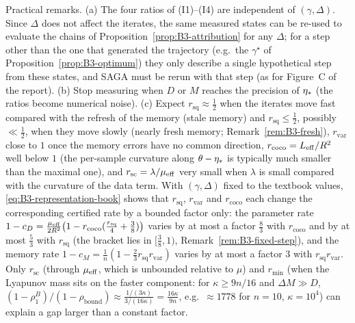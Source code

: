 Practical remarks. (a) The four ratios of (I1)--(I4) are independent of $(\gamma,\Delta)$. Since $\Delta$ does not affect the iterates, the same measured states can be re-used to evaluate the chains of Proposition~\ref{prop:B3-attribution} for any $\Delta$; for a step other than the one that generated the trajectory (e.g.\ the $\gamma^\star$ of Proposition~\ref{prop:B3-optimum}) they only describe a single hypothetical step from these states, and SAGA must be rerun with that step (as for Figure~C of the report). (b) Stop measuring when $D$ or $M$ reaches the precision of $\eta_\ast$ (the ratios become numerical noise). (c) Expect $r_{\mathrm{sq}}\approx\frac12$ when the iterates move fast compared with the refresh of the memory (stale memory) and $r_{\mathrm{sq}}\le\frac12$, possibly $\ll\frac12$, when they move slowly (nearly fresh memory; Remark~\ref{rem:B3-fresh}), $r_{\mathrm{var}}$ close to $1$ once the memory errors have no common direction, $r_{\mathrm{coco}}=L_{\mathrm{eff}}/R^2$ well below $1$ (the per-sample curvature along $\theta-\eta_\ast$ is typically much smaller than the maximal one), and $r_{\mathrm{sc}}=\lambda/\mu_{\mathrm{eff}}$ very small when $\lambda$ is small compared with the curvature of the data term. With $(\gamma,\Delta)$ fixed to the textbook values, \eqref{eq:B3-representation-book} shows that $r_{\mathrm{sq}}$, $r_{\mathrm{var}}$ and $r_{\mathrm{coco}}$ each change the corresponding certified rate by a bounded factor only: the parameter rate $1-c_D=\frac{\mu_{\mathrm{eff}}}{2R^2}\big(1-r_{\mathrm{coco}}(\frac{r_{\mathrm{sq}}}4+\frac38)\big)$ varies by at most a factor $\frac83$ with $r_{\mathrm{coco}}$ and by at most $\frac53$ with $r_{\mathrm{sq}}$ (the bracket lies in $[\frac38,1)$, Remark~\ref{rem:B3-fixed-step}), and the memory rate $1-c_M=\frac1n(1-\frac23r_{\mathrm{sq}}r_{\mathrm{var}})$ varies by at most a factor $3$ with $r_{\mathrm{sq}}r_{\mathrm{var}}$. Only $r_{\mathrm{sc}}$ (through $\mu_{\mathrm{eff}}$, which is unbounded relative to $\mu$) and $r_{\min}$ (when the Lyapunov mass sits on the faster component: for $\kappa\ge9n/16$ and $\Delta M\gg D$, $(1-\rho^B_1)/(1-\rho_{\mathrm{bound}})\approx\frac{1/(3n)}{3/(16\kappa)}=\frac{16\kappa}{9n}$, e.g.\ $\approx1778$ for $n=10$, $\kappa=10^4$) can explain a gap larger than a constant factor.

